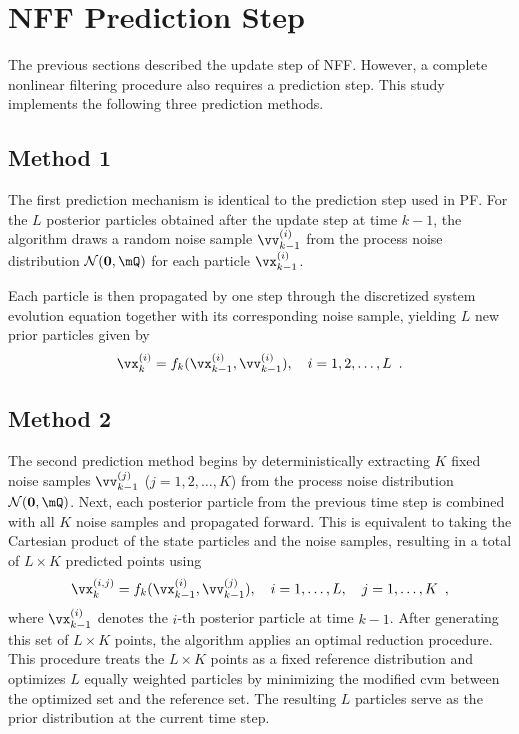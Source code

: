 \section{NFF Prediction Step}
\label{sec:prediction_step}

The previous sections described the update step of NFF. However, a complete nonlinear filtering procedure also requires a prediction step. This study implements the following three prediction methods.

\subsection{Method 1}
\label{subsec:method1}

The first prediction mechanism is identical to the prediction step used in PF. For the $L$ posterior particles obtained after the update step at time $k-1$, the algorithm draws a random noise sample $\vv_{k-1}^{(i)}$ from the process noise distribution $\mathcal{N}(\mathbf{0}, \mQ)$ for each particle $\vx_{k-1}^{(i)}$.

Each particle is then propagated by one step through the discretized system evolution equation together with its corresponding noise sample, yielding $L$ new prior particles given by
\begin{equation}
	\vx_k^{(i)} = f_k(\vx_{k-1}^{(i)}, \vv_{k-1}^{(i)}), \quad i = 1, 2, \dots, L \enspace .
\end{equation}

\subsection{Method 2}
\label{subsec:method2}

The second prediction method begins by deterministically extracting $K$ fixed noise samples $\vv_{k-1}^{(j)}$ ($j = 1, 2, \dots, K$) from the process noise distribution $\mathcal{N}(\mathbf{0}, \mQ)$. Next, each posterior particle from the previous time step is combined with all $K$ noise samples and propagated forward. This is equivalent to taking the Cartesian product of the state particles and the noise samples, resulting in a total of $L \times K$ predicted points using
\begin{equation}
	\vx_k^{(i,j)} = f_k(\vx_{k-1}^{(i)}, \vv_{k-1}^{(j)}), \quad i = 1, \dots, L, \quad j = 1, \dots, K \enspace ,
\end{equation}
where $\vx_{k-1}^{(i)}$ denotes the $i$-th posterior particle at time $k-1$. After generating this set of $L \times K$ points, the algorithm applies an optimal reduction procedure. This procedure treats the $L \times K$ points as a fixed reference distribution and optimizes $L$ equally weighted particles by minimizing the modified \ac{cvm} between the optimized set and the reference set. The resulting $L$ particles serve as the prior distribution at the current time step.

